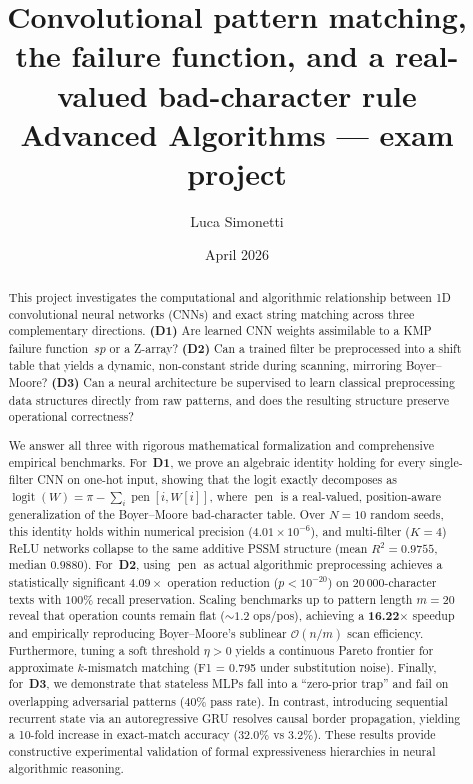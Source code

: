 \documentclass[11pt,a4paper]{article}
\title{Convolutional pattern matching, the failure function, and a
real-valued bad-character rule\\
{\large Advanced Algorithms — exam project}}
\author{Luca Simonetti}
\date{April 2026}
\newcommand{\pen}{\operatorname{pen}}
\begin{document}
\maketitle

\begin{abstract}
\noindent
This project investigates the computational and algorithmic relationship between 1D convolutional neural networks (CNNs) and exact string matching across three complementary directions.
\textbf{(D1)} Are learned CNN weights assimilable to a KMP failure function~$sp$ or a Z-array?
\textbf{(D2)} Can a trained filter be preprocessed into a shift table that yields a dynamic, non-constant stride during scanning, mirroring Boyer--Moore?
\textbf{(D3)} Can a neural architecture be supervised to learn classical preprocessing data structures directly from raw patterns, and does the resulting structure preserve operational correctness?

We answer all three with rigorous mathematical formalization and comprehensive empirical benchmarks. For~\textbf{D1}, we prove an algebraic identity holding for every single-filter CNN on one-hot input, showing that the logit exactly decomposes as $\operatorname{logit}(W) = \pi - \sum_i \pen[i, W[i]]$, where $\pen$ is a real-valued, position-aware generalization of the Boyer--Moore bad-character table. Over $N=10$ random seeds, this identity holds within numerical precision ($4.01\times 10^{-6}$), and multi-filter ($K=4$) ReLU networks collapse to the same additive PSSM structure (mean $R^2 = 0.9755$, median $0.9880$).
For~\textbf{D2}, using $\pen$ as actual algorithmic preprocessing achieves a statistically significant $4.09\times$ operation reduction ($p < 10^{-20}$) on $20\,000$-character texts with $100\%$ recall preservation. Scaling benchmarks up to pattern length $m=20$ reveal that operation counts remain flat ($\sim 1.2$ ops/pos), achieving a \textbf{16.22\(\times\)} speedup and empirically reproducing Boyer--Moore's sublinear $\mathcal{O}(n/m)$ scan efficiency. Furthermore, tuning a soft threshold $\eta > 0$ yields a continuous Pareto frontier for approximate $k$-mismatch matching (F1 = 0.795 under substitution noise).
Finally, for~\textbf{D3}, we demonstrate that stateless MLPs fall into a ``zero-prior trap'' and fail on overlapping adversarial patterns ($40\%$ pass rate). In contrast, introducing sequential recurrent state via an autoregressive GRU resolves causal border propagation, yielding a 10-fold increase in exact-match accuracy ($32.0\%$ vs $3.2\%$). These results provide constructive experimental validation of formal expressiveness hierarchies in neural algorithmic reasoning.
\end{abstract}
\end{document}
